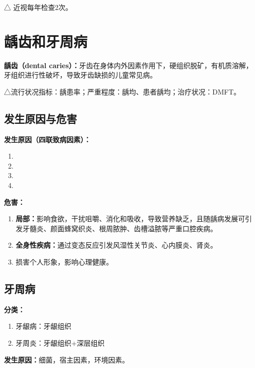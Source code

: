 \begin{exambox}
△ 近视每年检查2次。
\end{exambox}

\section{龋齿和牙周病}\difficulty

\begin{defbox}
\textbf{龋齿（dental caries）：}牙齿在身体内外因素作用下，硬组织脱矿，有机质溶解，牙组织进行性破坏，导致牙齿缺损的儿童常见病。

△流行状况指标：龋患率；严重程度：龋均、患者龋均；治疗状况：DMFT。
\end{defbox}

\subsection{发生原因与危害}

\begin{keybox}
\textbf{发生原因（四联致病因素）：}
\begin{enumerate}[leftmargin=*]
    \item {}
    \item {}
    \item {}
    \item {}
\end{enumerate}

\textbf{危害：}
\begin{enumerate}[leftmargin=*]
    \item \textbf{局部：}影响食欲，干扰咀嚼、消化和吸收，导致营养缺乏，且随龋病发展可引发牙髓炎、颜面蜂窝织炎、根周脓肿、齿槽溢脓等严重口腔疾病。
    \item \textbf{全身性疾病：}通过变态反应引发风湿性关节炎、心内膜炎、肾炎。
    \item 损害个人形象，影响心理健康。
\end{enumerate}
\end{keybox}

\subsection{牙周病}

\begin{tipbox}
\textbf{分类：}
\begin{enumerate}[leftmargin=*]
    \item 牙龈病：牙龈组织
    \item 牙周炎：牙龈组织+深层组织
\end{enumerate}

\textbf{发生原因：}细菌，宿主因素，环境因素。
\end{tipbox}


